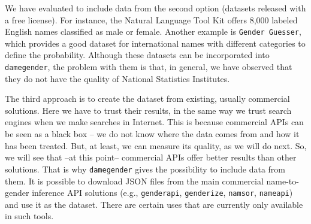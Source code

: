 \documentclass[a4paper]{article}
\begin{document}



We have evaluated to include data from the second option (datasets released with a free license). 
For instance, the Natural Language Tool Kit offers 8,000 labeled English names classified as male or female. 
Another example is \texttt{Gender Guesser}, which provides a good dataset for international names with different categories to define the probability. 
Although these datasets can be incorporated into \texttt{damegender}, the problem with them is that, in general, we have observed that they do not have the quality of National Statistics Institutes. 


The third approach is to create the dataset from existing, usually commercial solutions.
Here we have to trust their results, in the same way we trust search engines when we make searches in Internet.
This is because commercial APIs can be seen as a black box -- we do not know where the data comes from and how it has been treated.
But, at least, we can measure its quality, as we will do next.
So, we will see that --at this point-- commercial APIs offer better results than other solutions.
That is why \texttt{damegender} gives the possibility to include data from them.
It is possible to download JSON files from the main commercial name-to-gender inference API solutions (e.g., \texttt{genderapi}, \texttt{genderize}, \texttt{namsor}, \texttt{nameapi}) and use it as the dataset.
There are certain uses that are currently only available in such tools.
\end{document}
